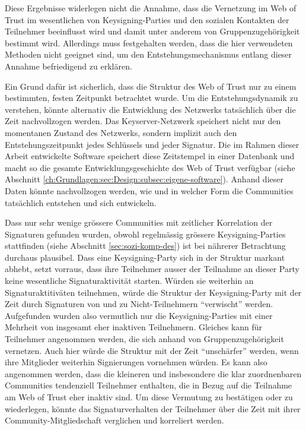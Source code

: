 Diese Ergebnisse widerlegen nicht die Annahme, dass die Vernetzung im
Web of Trust im wesentlichen von Keysigning-Parties und den sozialen
Kontakten der Teilnehmer beeinflusst wird und damit unter anderem von
Gruppenzugeh\"origkeit bestimmt wird. Allerdings muss festgehalten
werden, dass die hier verwendeten Methoden nicht geeignet sind, um den
Entstehungsmechanismus entlang dieser Annahme befriedigend zu
erkl\"aren. 

Ein Grund daf\"ur ist sicherlich, dass die Struktur des Web of Trust
nur zu einem bestimmten, festen Zeitpunkt betrachtet wurde. Um die
Entstehungsdynamik zu verstehen, k\"onnte alternativ die Entwicklung
des Netzwerks tats\"achlich \"uber die Zeit nachvollzogen werden. Das
Keyserver-Netzwerk speichert nicht nur den momentanen Zustand des
Netzwerks, sondern implizit auch den Entstehungszeitpunkt jedes
Schl\"ussels und jeder Signatur. Die im Rahmen dieser Arbeit
entwickelte Software speichert diese Zeitstempel in einer Datenbank
und macht so die gesamte Entwicklungsgeschichte des Web of Trust
verf\"ugbar (siehe Abschnitt
\ref{ch:Grundlagen:sec:Design:subsec:eigene-software}). Anhand dieser
Daten k\"onnte nachvollzogen werden, wie und in welcher Form die
Communities tats\"achlich entstehen und sich entwickeln.

Dass nur sehr wenige gr\"ossere Communities mit zeitlicher Korrelation
der Signaturen gefunden wurden, obwohl regelm\"assig gr\"ossere
Keysigning-Parties stattfinden (siehe Abschnitt
\ref{sec:sozi-komp-des}) ist bei n\"ahrerer Betrachtung durchaus
plausibel. Dass eine Keysigning-Party sich in der Struktur markant
abhebt, setzt vorraus, dass ihre Teilnehmer ausser der Teilnahme an
dieser Party keine wesentliche Signaturaktivit\"at starten. W\"urden
sie weiterhin an Signaturaktitiv\"aten teilnehmen, w\"urde die
Struktur der Keysigning-Party mit der Zeit durch Signaturen von und zu
Nicht-Teilnehmern ``verwischt'' werden. Aufgefunden wurden also
vermutlich nur die Keysigning-Parties mit einer Mehrheit von insgesamt
eher inaktiven Teilnehmern. Gleiches kann f\"ur Teilnehmer angenommen
werden, die sich anhand von Gruppenzugeh\"origkeit vernetzen. Auch
hier w\"urde die Struktur mit der Zeit ``unsch\"arfer'' werden, wenn
ihre Mitglieder weiterhin Signierungen vornehmen w\"urden. Es kann
also angenommen werden, dass die kleineren und insbesondere die klar
zuordnenbaren Communities tendenziell Teilnehmer enthalten, die in
Bezug auf die Teilnahme am Web of Trust eher inaktiv sind. Um diese
Vermutung zu best\"atigen oder zu wiederlegen, k\"onnte das
Signaturverhalten der Teilnehmer \"uber die Zeit mit ihrer
Community-Mitgliedschaft verglichen und korreliert werden.

